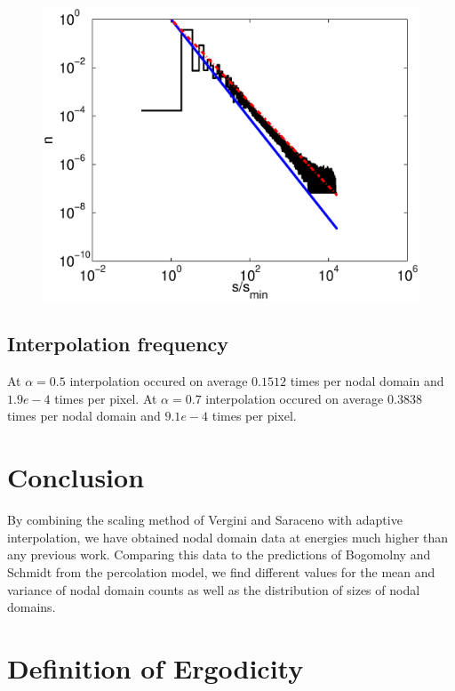 \documentclass{report}
\begin{document}
\begin{figure}
  \begin{center}
    \includegraphics[width=\textwidth]{figs/results/perc_100_to_2000_sizes.eps}
  \end{center}
\end{figure}


\section{Interpolation frequency}
At $\alpha = 0.5$ interpolation occured on average $0.1512$ times per nodal domain and $1.9e-4$ times per pixel.
At $\alpha = 0.7$ interpolation occured on average $0.3838$ times per nodal domain and $9.1e-4$ times per pixel.


\chapter{Conclusion}
By combining the scaling method of Vergini and Saraceno \cite{vergini} with adaptive interpolation, we have obtained nodal domain data at energies much higher than any previous work. Comparing this data to the predictions of Bogomolny and Schmidt \cite{bogomolny} from the percolation model, we find different values for the mean and variance of nodal domain counts as well as the distribution of sizes of nodal domains.

\appendix
\chapter{Definition of Ergodicity}
\label{sec:ergodicity}
\end{document}
